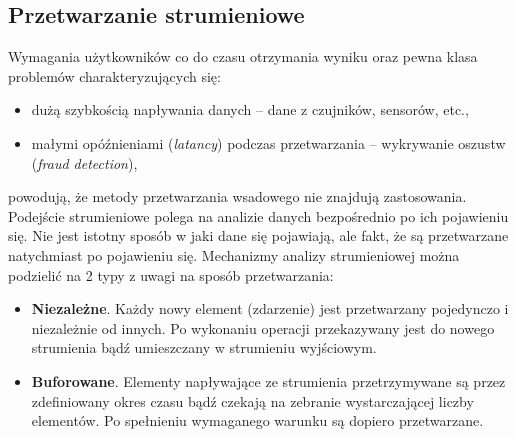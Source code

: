 
\subsection{Przetwarzanie strumieniowe}

Wymagania użytkowników co do czasu otrzymania wyniku
oraz pewna klasa problemów charakteryzujących się:
\begin{itemize}
	\item dużą szybkością napływania danych -- dane z czujników, sensorów, etc.,
	\item małymi opóźnieniami (\textit{latancy}) podczas przetwarzania -- wykrywanie oszustw (\textit{fraud detection}),
\end{itemize}
powodują,
że metody przetwarzania wsadowego nie znajdują zastosowania.
Podejście strumieniowe polega na analizie danych bezpośrednio po ich pojawieniu się.
Nie jest istotny sposób w jaki dane się pojawiają,
ale fakt,
że są przetwarzane natychmiast po pojawieniu się.
Mechanizmy analizy strumieniowej można podzielić na 2 typy z uwagi na sposób przetwarzania:
\begin{itemize}
	\item \textbf{Niezależne}.
	Każdy nowy element (zdarzenie) jest przetwarzany pojedynczo i niezależnie od innych.
	Po wykonaniu operacji przekazywany jest do nowego strumienia bądź umieszczany w strumieniu wyjściowym.
	\item \textbf{Buforowane}.
	Elementy napływające ze strumienia przetrzymywane są przez zdefiniowany okres czasu
	bądź czekają na zebranie wystarczającej liczby elementów.
	Po spełnieniu wymaganego warunku są dopiero przetwarzane.
\end{itemize}

